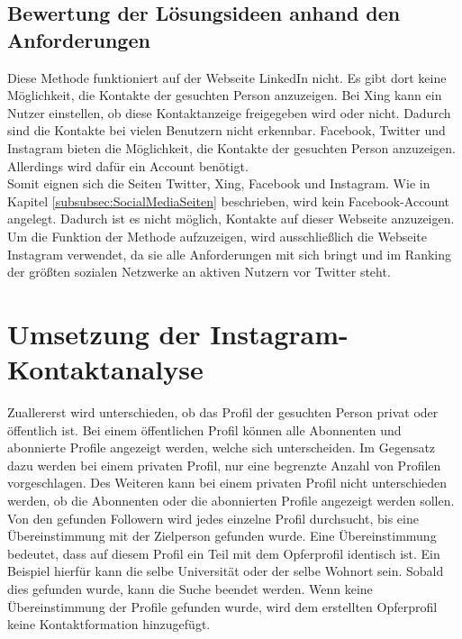 	\subsection{Bewertung der Lösungsideen anhand den Anforderungen}
	Diese Methode funktioniert auf der Webseite LinkedIn nicht. Es gibt dort keine Möglichkeit, die Kontakte der gesuchten Person anzuzeigen. Bei Xing kann ein Nutzer einstellen, ob diese Kontaktanzeige freigegeben wird oder nicht. Dadurch sind die Kontakte bei vielen Benutzern nicht erkennbar. Facebook, Twitter und Instagram bieten die Möglichkeit, die Kontakte der gesuchten Person anzuzeigen. Allerdings wird dafür ein Account benötigt.\\
	Somit eignen sich die Seiten Twitter, Xing, Facebook und Instagram. Wie in Kapitel \ref{subsubsec:SocialMediaSeiten} beschrieben, wird kein Facebook-Account angelegt. Dadurch ist es nicht möglich, Kontakte auf dieser Webseite anzuzeigen. Um die Funktion der Methode aufzuzeigen, wird ausschließlich die Webseite Instagram verwendet, da sie alle Anforderungen mit sich bringt und im Ranking der größten sozialen Netzwerke an aktiven Nutzern vor Twitter steht. \cite{RankingSozialeNetzwerke}

\section{Umsetzung der Instagram-Kontaktanalyse} 
Zuallererst wird unterschieden, ob das Profil der gesuchten Person privat oder öffentlich ist. Bei einem öffentlichen Profil können alle Abonnenten und abonnierte Profile angezeigt werden, welche sich unterscheiden. Im Gegensatz dazu werden bei einem privaten Profil, nur eine begrenzte Anzahl von Profilen vorgeschlagen. Des Weiteren kann bei einem privaten Profil nicht unterschieden werden, ob die Abonnenten oder die abonnierten Profile angezeigt werden sollen.\\
Von den gefunden Followern wird jedes einzelne Profil durchsucht, bis eine Übereinstimmung mit der Zielperson gefunden wurde. Eine Übereinstimmung bedeutet, dass auf diesem Profil ein Teil mit dem Opferprofil identisch ist. Ein Beispiel hierfür kann  die selbe Universität oder der selbe Wohnort sein. Sobald dies gefunden wurde, kann die Suche beendet werden. Wenn keine Übereinstimmung der Profile gefunden wurde, wird dem erstellten Opferprofil keine Kontaktformation hinzugefügt.

